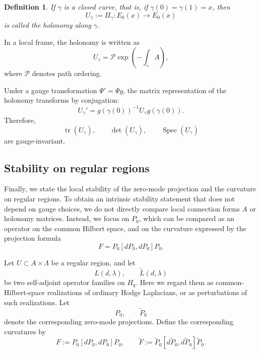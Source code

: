 \documentclass[pdflatex,sn-mathphys-num]{sn-jnl}%
\theoremstyle{thmstyleone}%
\theoremstyle{thmstyletwo}%
\theoremstyle{thmstylethree}%
\newtheorem{definition}{Definition}%
\begin{document}
\begin{definition}
If \(\gamma\) is a closed curve, that is, if \(\gamma(0)=\gamma(1)=x\), then
\[
U_\gamma:=\Pi_\gamma:E_0(x)\to E_0(x)
\]
is called the holonomy along \(\gamma\).
\end{definition}

In a local frame, the holonomy is written as
\[
U_\gamma
=
\mathcal{P}\exp\left(-\int_\gamma A\right),
\]
where \(\mathcal{P}\) denotes path ordering.

Under a gauge transformation \(\Psi'=\Psi g\), the matrix representation of the holonomy transforms by conjugation:
\[
U_\gamma'
=
g(\gamma(0))^{-1}U_\gamma g(\gamma(0)).
\]
Therefore,
\[
\operatorname{tr}(U_\gamma),
\qquad
\det(U_\gamma),
\qquad
\operatorname{Spec}(U_\gamma)
\]
are gauge-invariant.

\subsection{Stability on regular regions}

Finally, we state the local stability of the zero-mode projection and the curvature on regular regions. To obtain an intrinsic stability statement that does not depend on gauge choices, we do not directly compare local connection forms \(A\) or holonomy matrices. Instead, we focus on \(P_0\), which can be compared as an operator on the common Hilbert space, and on the curvature expressed by the projection formula
\[
F=P_0[dP_0,dP_0]P_0.
\]

Let \(U\subset A\times\Lambda\) be a regular region, and let
\[
L(d,\lambda),
\qquad
\widetilde L(d,\lambda)
\]
be two self-adjoint operator families on \(H_q\). Here we regard them as common-Hilbert-space realizations of ordinary Hodge Laplacians, or as perturbations of such realizations. Let
\[
P_0,\qquad \widetilde P_0
\]
denote the corresponding zero-mode projections. Define the corresponding curvatures by
\[
F:=P_0[dP_0,dP_0]P_0,
\qquad
\widetilde F:=
\widetilde P_0[d\widetilde P_0,d\widetilde P_0]\widetilde P_0.
\]
\end{document}
